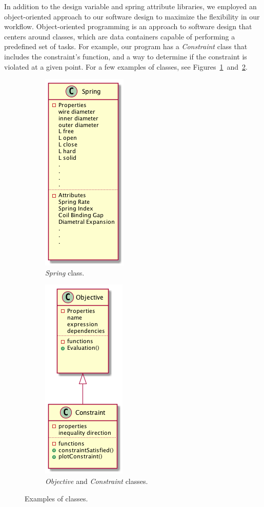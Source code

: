 \documentclass[10pt]{article}
\begin{document}
In addition to the design variable and spring attribute libraries, we employed an object-oriented approach to our software design to maximize the flexibility in our workflow. Object-oriented programming is an approach to software design that centers around classes, which are data containers capable of performing a predefined set of tasks. For example, our program has a \textit{Constraint} class that includes the constraint's function, and a way to determine if the constraint is violated at a given point. For a few examples of classes, see Figures~\ref{fig:Spring_Class}~and~\ref{fig:Objective_Constraint}. 
\begin{figure}[H]
			\begin{subfigure}{.5\textwidth}
				\centering
				\includegraphics[scale=.5]{Spring_Class.png}
				\caption{\textit{Spring} class.}
				\label{fig:Spring_Class}
			\end{subfigure}%
			\begin{subfigure}{.5\textwidth}
				  \centering
		 		\includegraphics[scale=.5]{Objective_Constraint.png}
				\caption{\textit{Objective} and \textit{Constraint} classes.}
				  \label{fig:Objective_Constraint}
			\end{subfigure}
			 \label{fig:Classes}
		  \caption{Examples of classes.}
		\end{figure}
\end{document}
